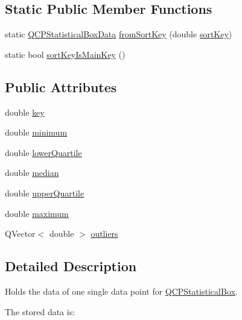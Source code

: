 \subsection*{Static Public Member Functions}
\begin{DoxyCompactItemize}
\item 
static \hyperlink{class_q_c_p_statistical_box_data}{Q\+C\+P\+Statistical\+Box\+Data} \hyperlink{class_q_c_p_statistical_box_data_a8c391d5a6c7cebc79b664aad9917b499}{from\+Sort\+Key} (double \hyperlink{class_q_c_p_statistical_box_data_a168100275e85935207deec86216abc88}{sort\+Key})
\item 
static bool \hyperlink{class_q_c_p_statistical_box_data_a4710ae44b85d4b34b13c3f9301f28c01}{sort\+Key\+Is\+Main\+Key} ()
\end{DoxyCompactItemize}
\subsection*{Public Attributes}
\begin{DoxyCompactItemize}
\item 
double \hyperlink{class_q_c_p_statistical_box_data_a2d0b5ca5130e8a73294c46b8b2fd77b8}{key}
\item 
double \hyperlink{class_q_c_p_statistical_box_data_adc2f4b8cbff9f2e4a676f32bad8a7e3a}{minimum}
\item 
double \hyperlink{class_q_c_p_statistical_box_data_af9f478b4ea0789fa6cff7eebb654b5d4}{lower\+Quartile}
\item 
double \hyperlink{class_q_c_p_statistical_box_data_a116cd53ae6685979ec3b051cfc7dbba5}{median}
\item 
double \hyperlink{class_q_c_p_statistical_box_data_a5604dfe04b103e5ac73ce7895b46303b}{upper\+Quartile}
\item 
double \hyperlink{class_q_c_p_statistical_box_data_aa2800abda337decfc4277cb8bf846d6f}{maximum}
\item 
Q\+Vector$<$ double $>$ \hyperlink{class_q_c_p_statistical_box_data_abaa27539fbd941d3f1eb8169e881e308}{outliers}
\end{DoxyCompactItemize}


\subsection{Detailed Description}
Holds the data of one single data point for \hyperlink{class_q_c_p_statistical_box}{Q\+C\+P\+Statistical\+Box}. 

The stored data is\+:

